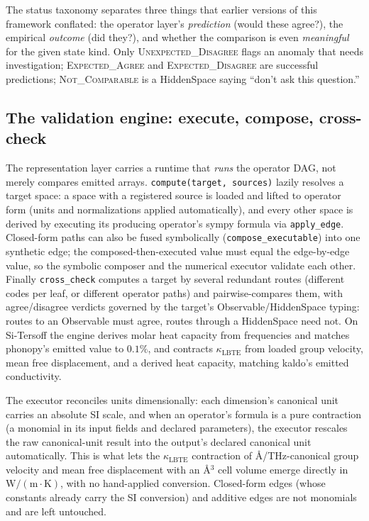 \documentclass[11pt,a4paper]{article}
\begin{document}
The status taxonomy separates three things that earlier versions of this framework
conflated: the operator layer's \emph{prediction} (would these agree?), the empirical
\emph{outcome} (did they?), and whether the comparison is even \emph{meaningful} for
the given state kind. Only \textsc{Unexpected\_Disagree} flags an anomaly that needs
investigation; \textsc{Expected\_Agree} and \textsc{Expected\_Disagree} are successful
predictions; \textsc{Not\_Comparable} is a HiddenSpace saying ``don't ask this
question.''

\subsection{The validation engine: execute, compose, cross-check}

The representation layer carries a runtime that \emph{runs} the operator DAG,
not merely compares emitted arrays. \texttt{compute(target, sources)} lazily
resolves a target space: a space with a registered source is loaded and lifted
to operator form (units and normalizations applied automatically), and every
other space is derived by executing its producing operator's sympy formula via
\texttt{apply\_edge}. Closed-form paths can also be fused symbolically
(\texttt{compose\_executable}) into one synthetic edge; the composed-then-executed
value must equal the edge-by-edge value, so the symbolic composer and the
numerical executor validate each other. Finally \texttt{cross\_check} computes a
target by several redundant routes (different codes per leaf, or different
operator paths) and pairwise-compares them, with agree/disagree verdicts
governed by the target's Observable/HiddenSpace typing: routes to an Observable
must agree, routes through a HiddenSpace need not. On Si-Tersoff the engine
derives molar heat capacity from frequencies and matches phonopy's emitted value
to $0.1\%$, and contracts $\kappa_{\mathrm{LBTE}}$ from loaded group velocity,
mean free displacement, and a derived heat capacity, matching kaldo's emitted
conductivity.

The executor reconciles units dimensionally: each dimension's canonical unit
carries an absolute SI scale, and when an operator's formula is a pure
contraction (a monomial in its input fields and declared parameters), the
executor rescales the raw canonical-unit result into the output's declared
canonical unit automatically. This is what lets the $\kappa_{\mathrm{LBTE}}$
contraction of \AA{}/THz-canonical group velocity and mean free displacement with
an \AA{}$^3$ cell volume emerge directly in $\mathrm{W/(m\cdot K)}$, with no
hand-applied conversion. Closed-form edges (whose constants already carry the
SI conversion) and additive edges are not monomials and are left untouched.
\end{document}
